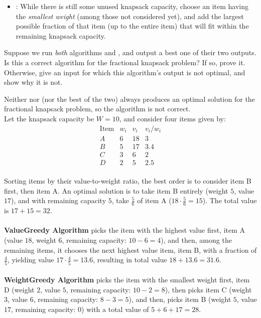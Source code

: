 \documentclass[11pt,addpoints,answers]{exam}
\begin{document}
\begin{questions}
\begin{parts}
\begin{itemize}
    \item {}: While there is still some unused knapsack capacity, choose an item having the \emph{smallest weight} (among those not considered yet), and add the largest possible fraction of that item (up to the entire item) that will fit within the remaining knapsack capacity.
    \end{itemize}

    Suppose we run \emph{both} algorithms  and , and output a best one of their two outputs.
    Is this a correct algorithm for the fractional knapsack problem?
    If so, prove it.
    Otherwise, give an input for which this algorithm's output is not optimal, and show why it is not.

    \begin{solution}
      Neither  nor  (nor the best of the two) always produces an optimal solution for the fractional knapsack problem, so the algorithm is not correct.
      \\
      Let the knapsack capacity be $W=10$, and consider four items given by:
      \[
      \begin{array}{c|c|c|c}
      \text{Item} & w_i & v_i & v_i/w_i \\ \hline
      A & 6 & 18 & 3\\[1mm]
      B & 5 & 17 & 3.4\\[1mm]
      C & 3 & 6 & 2\\[1mm]
      D & 2 & 5 & 2.5
      \end{array}
      \]
      \\
      Sorting items by their value-to-weight ratio, the best order is to consider item B first, then item A. An optimal solution is to take item B entirely (weight $5$, value $17$), and with remaining capacity $5$, take $\frac{5}{6}$ of item A ($18\cdot\frac{5}{6}=15$). The total value is $17+15=32$.\\
      \\
      \textbf{ValueGreedy Algorithm} picks the item with the highest value first, item A (value $18$, weight $6$, remaining capacity: $10-6=4$), and then, among the remaining items, it chooses the next highest value item, item B, with a fraction of $\frac{4}{5}$, yielding value $17\cdot\frac{4}{5}=13.6$, resulting in total value $18 + 13.6 = 31.6$.\\
      \\
      \textbf{WeightGreedy Algorithm}  picks the item with the smallest weight first, item D (weight $2$, value $5$, remaining capacity: $10-2=8$), then picks item C (weight $3$, value $6$, remaining capacity: $8-3=5$), and then, picks item B (weight $5$, value $17$, remaining capacity: $0$) with a total value of $5 + 6 + 17 = 28$.\\

\end{solution}
\end{parts}
\end{questions}
\end{document}
